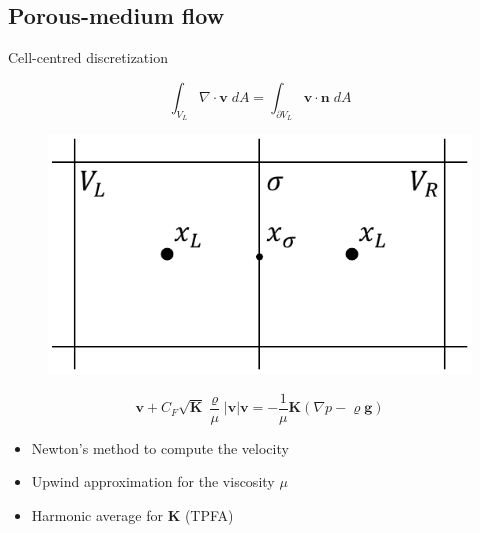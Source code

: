 \documentclass{beamer}
\begin{document}
\subsection*{Porous-medium flow}
\begin{frame}{Cell-centred discretization}
\begin{minipage}[t]{0.49\textwidth}
	\vspace{0.5cm}
\begin{equation*}
\int_{V_L} \nabla \cdot \mathbf{v} \; dA = \int_{\partial V_L} \mathbf{v} 
\cdot \mathbf{n} \; dA
\end{equation*}
\end{minipage}
\begin{minipage}[t]{0.49\textwidth}
\begin{figure}
	\centering
	\includegraphics[height=0.3\textheight]{cctpfa.pdf}
\end{figure}
\end{minipage}
\begin{equation*}
	\mathbf{v} + C_F \sqrt{\mathbf{K}} \frac{\varrho}{\mu} |\mathbf{v}| 
	\mathbf{v} = - \frac{1}{\mu}\mathbf{K} (\nabla p - \varrho \mathbf{g})
\end{equation*}
\begin{itemize}
	\item Newton's method to compute the velocity
	\item Upwind approximation for the viscosity $\mu$
	\item Harmonic average for $\mathbf{K}$ (TPFA)
\end{itemize}

\end{frame}
\end{document}
